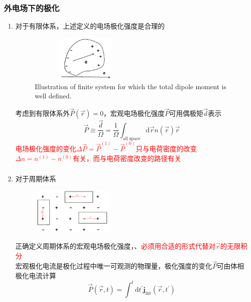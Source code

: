 \documentclass[cjk,slidestop,compress,mathserif,blue]{beamer}
\begin{document}
\frame
{
	\frametitle{外电场下的极化}
			\begin{enumerate}
				\item 对于有限体系，上述定义的电场极化强度是合理的
\begin{figure}[h!]
\centering
\vspace*{-0.15in}
\includegraphics[height=0.9in,width=2.2in,viewport=0 0 1100 550,clip]{Figures/Polarize_insulator.png}
\caption{\tiny \textrm{Illustration of finite system for which the total dipole moment is well defined.}}%
\label{Polarization_insulator}
\end{figure} 
考虑到有限体系外$\vec P(\vec r)=0$，宏观电场极化强度$\vec P$可用偶极矩$\vec d$表示
\begin{displaymath}
	\vec P\equiv\frac{\vec d}{\Omega}=\frac1{\Omega}\int_{\mathrm{all\;space}}\mathrm{d}\vec rn(\vec r)\vec r
\end{displaymath}
\textcolor{red}{电场极化强度的变化$\Delta\vec P=\vec P^{(1)}-\vec P^{(0)}$只与电荷密度的改变$\Delta n=n^{(1)}-n^{(0)}$有关，而与电荷密度改变的路径有关}
			\end{enumerate}
}

\frame
{
	\frametitle{}
			\begin{enumerate}
				\setcounter{enumi}{1}
				\item 对于周期体系
\begin{figure}[h!]
\centering
\vspace*{-0.15in}
\includegraphics[height=0.9in,width=1.6in,viewport=0 0 1100 540,clip]{Figures/Polarize_insulator-2.png}
\caption{\textrm{\fontsize{7.5pt}{5.2pt}\selectfont{Point charge model of an ionic crystal. The dipole is obviously not unique since the cells shown all have different moments.}}}%
\label{Polarization_insulator-2}
\end{figure} 
正确定义周期体系的宏观电场极化强度，、\textcolor{red}{必须用合适的形式代替对$\vec r$的无限积分}\\
宏观极化电流是极化过程中唯一可观测的物理量，极化强度的变化$\vec P$可由体相极化电流计算
\begin{displaymath}
	\vec P(\vec r,t)=\int^t\mathrm{d}t^{\prime}\mathbf{j}_{\mathrm{int}}(\vec r,t^{\prime})
\end{displaymath}
			\end{enumerate}
}
\end{document}
